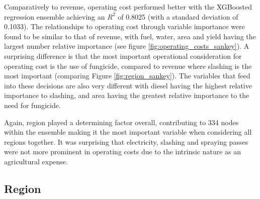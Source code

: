 \documentclass[review,12pt,authoryear]{elsarticle}
\begin{document}
\begin{linenumbers}
Comparatively to revenue, operating cost performed better with the XGBoosted regression ensemble achieving an $R^2$ of 0.8025 (with a standard deviation of 0.1033). The relationships to operating cost through variable importance were found to be similar to that of revenue, with fuel, water, area and yield having the largest number relative importance (see figure \ref{fig:operating_costs_sankey}). A surprising difference is that the most important operational consideration for operating cost is the use of fungicide, compared to revenue where slashing is the most important (comparing Figure \ref{fig:region_sankey}). The variables that feed into these decisions are also very different with diesel having the highest relative importance to slashing, and area having the greatest relative importance to the need for fungicide.
\par
Again, region played a determining factor overall, contributing to 334 nodes within the ensemble making it the most important variable when considering all regions together. It was surprising that electricity, slashing and spraying passes were not more prominent in operating costs due to the intrinsic nature as an agricultural expense.
\par


\subsection{Region}


\end{linenumbers}
\end{document}
